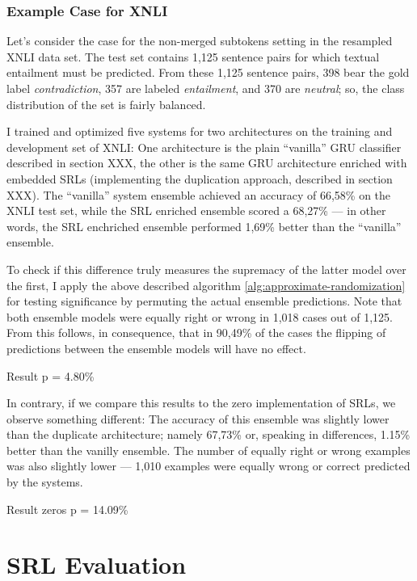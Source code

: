 \subsubsection{Example Case for XNLI}


Let's consider the case for the non-merged subtokens setting in the resampled XNLI data set. The test
set contains 1,125 sentence pairs for which textual entailment must be predicted. From these 1,125
sentence pairs, 398 bear the gold label \emph{contradiction}, 357 are labeled \emph{entailment},
and 370 are \emph{neutral}; so, the class distribution of the set is fairly balanced.

I trained and optimized five systems for two architectures on the training and development set
of XNLI: One architecture is the plain ``vanilla'' GRU classifier described in section XXX, the
other is the same GRU architecture enriched with embedded SRLs (implementing the duplication
approach, described in section XXX). The ``vanilla'' system ensemble achieved an accuracy of
66,58\% on the XNLI test set, while the SRL enriched ensemble scored a 68,27\% --- in other
words, the SRL enchriched ensemble performed 1,69\% better than the ``vanilla'' ensemble.

To check if this difference truly measures the supremacy of the latter model over the first, I
apply the above described algorithm \ref{alg:approximate-randomization} for testing significance
by permuting the actual ensemble predictions. Note that both ensemble models were equally
right or wrong in 1,018 cases out of 1,125.  From this follows, in consequence, that in 90,49\%
of the cases the flipping of predictions between the ensemble models will have no effect.

Result p = 4.80\%

In contrary, if we compare this results to the zero implementation of SRLs, we observe something
different: The accuracy of this ensemble was slightly lower than the duplicate architecture;
namely 67,73\% or, speaking in differences, 1.15\% better than the vanilly ensemble. The
number of equally right or wrong examples was also slightly lower --- 1,010 examples were
equally wrong or correct predicted by the systems.

Result zeros p = 14.09\%

\section{SRL Evaluation}
\label{sec:srl-evaluation}

